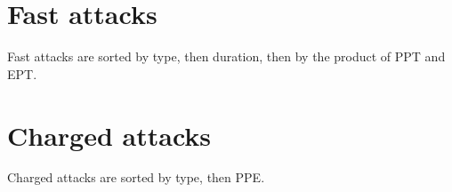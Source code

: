 \documentclass[ebook,10pt,openany,oneside]{memoir}
\begin{document}
\section{Fast attacks\label{sec:usersfast}}
Fast attacks are sorted by type, then duration, then by the product of PPT and EPT\@.

\section{Charged attacks\label{sec:userscharged}}
Charged attacks are sorted by type, then PPE\@.

\backmatter

\end{document}
